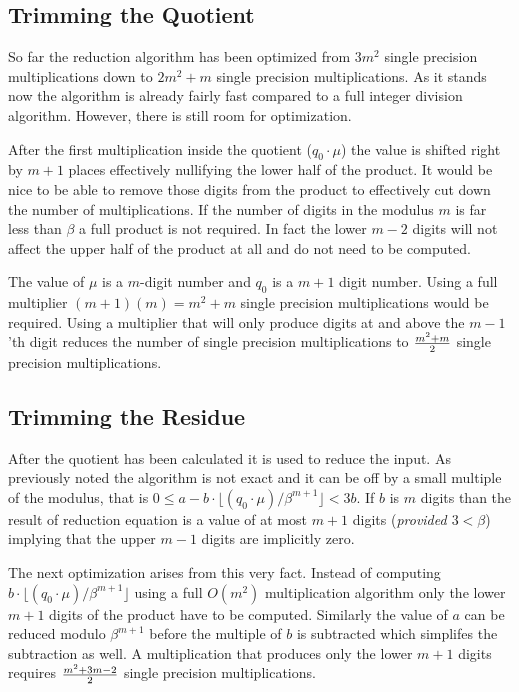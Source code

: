 \documentclass[b5paper]{book}
\begin{document}
\subsection{Trimming the Quotient}
So far the reduction algorithm has been optimized from $3m^2$ single precision multiplications down to $2m^2 + m$ single precision multiplications.  As 
it stands now the algorithm is already fairly fast compared to a full integer division algorithm.  However, there is still room for
optimization.  

After the first multiplication inside the quotient ($q_0 \cdot \mu$) the value is shifted right by $m + 1$ places effectively nullifying the lower
half of the product.  It would be nice to be able to remove those digits from the product to effectively cut down the number of multiplications.  
If the number of digits in the modulus $m$ is far less than $\beta$ a full product is not required.  In fact the lower $m - 2$ digits will not
affect the upper half of the product at all and do not need to be computed.  

The value of $\mu$ is a $m$-digit number and $q_0$ is a $m + 1$ digit number.  Using a full multiplier $(m + 1)(m) = m^2 + m$ single precision
multiplications would be required.  Using a multiplier that will only produce digits at and above the $m - 1$'th digit reduces the number
of single precision multiplications to ${m^2 + m} \over 2$ single precision multiplications.  

\subsection{Trimming the Residue}
After the quotient has been calculated it is used to reduce the input.  As previously noted the algorithm is not exact and it can be off by a small
multiple of the modulus, that is $0 \le a - b \cdot \lfloor (q_0 \cdot \mu) / \beta^{m+1} \rfloor < 3b$.  If $b$ is $m$ digits than the 
result of reduction equation is a value of at most $m + 1$ digits (\textit{provided $3 < \beta$}) implying that the upper $m - 1$ digits are
implicitly zero.  

The next optimization arises from this very fact.  Instead of computing $b \cdot \lfloor (q_0 \cdot \mu) / \beta^{m+1} \rfloor$ using a full
$O(m^2)$ multiplication algorithm only the lower $m+1$ digits of the product have to be computed.  Similarly the value of $a$ can
be reduced modulo $\beta^{m+1}$ before the multiple of $b$ is subtracted which simplifes the subtraction as well.  A multiplication that produces 
only the lower $m+1$ digits requires ${m^2 + 3m - 2} \over 2$ single precision multiplications.  
\end{document}
